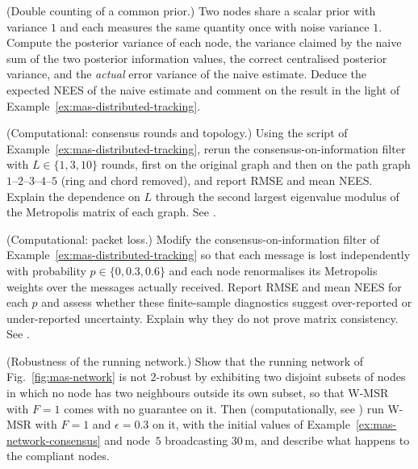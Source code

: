 \begin{prob}\label{prob:ch06:4}
(Double counting of a common prior.) Two nodes share a scalar prior with variance $1$ and each measures the same quantity once with noise variance $1$. Compute the posterior variance of each node, the variance claimed by the naive sum of the two posterior information values, the correct centralised posterior variance, and the \emph{actual} error variance of the naive estimate. Deduce the expected NEES of the naive estimate and comment on the result in the light of Example~\ref{ex:mas-distributed-tracking}.
\end{prob}

\begin{prob}\label{prob:ch06:5}
(Computational: consensus rounds and topology.) Using the script of Example~\ref{ex:mas-distributed-tracking}, rerun the consensus-on-information filter with $L\in\{1,3,10\}$ rounds, first on the original graph and then on the path graph $1$--$2$--$3$--$4$--$5$ (ring and chord removed), and report RMSE and mean NEES. Explain the dependence on $L$ through the second largest eigenvalue modulus of the Metropolis matrix of each graph. See .
\end{prob}

\begin{prob}\label{prob:ch06:6}
(Computational: packet loss.) Modify the consensus-on-information filter of Example~\ref{ex:mas-distributed-tracking} so that each message is lost independently with probability $p\in\{0,0.3,0.6\}$ and each node renormalises its Metropolis weights over the messages actually received. Report RMSE and mean NEES for each $p$ and assess whether these finite-sample diagnostics suggest over-reported or under-reported uncertainty. Explain why they do not prove matrix consistency. See .
\end{prob}

\begin{prob}\label{prob:ch06:7}
(Robustness of the running network.) Show that the running network of Fig.~\ref{fig:mas-network} is not $2$-robust by exhibiting two disjoint subsets of nodes in which no node has two neighbours outside its own subset, so that W-MSR with $F=1$ comes with no guarantee on it. Then (computationally, see ) run W-MSR with $F=1$ and $\epsilon=0.3$ on it, with the initial values of Example~\ref{ex:mas-network-consensus} and node~$5$ broadcasting $30$\,m, and describe what happens to the compliant nodes.
\end{prob}

